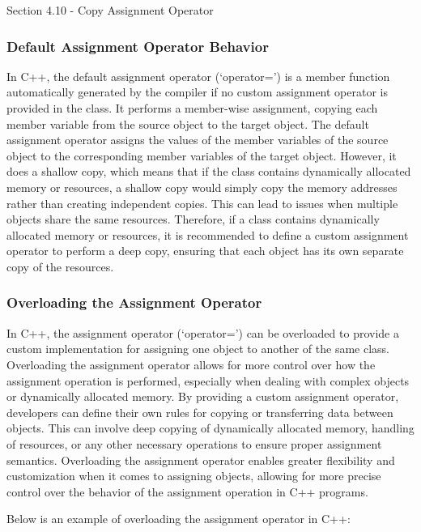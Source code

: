 \begin{notes}{Section 4.10 - Copy Assignment Operator}
    \subsubsection*{Default Assignment Operator Behavior}

    In C++, the default assignment operator (`operator=') is a member function automatically generated by the compiler if no custom assignment operator is provided in the class. It performs a member-wise assignment, copying each member variable from the source object to 
    the target object. The default assignment operator assigns the values of the member variables of the source object to the corresponding member variables of the target object. However, it does a shallow copy, which means that if the class contains dynamically allocated 
    memory or resources, a shallow copy would simply copy the memory addresses rather than creating independent copies. This can lead to issues when multiple objects share the same resources. Therefore, if a class contains dynamically allocated memory or resources, it is 
    recommended to define a custom assignment operator to perform a deep copy, ensuring that each object has its own separate copy of the resources.
    
    \subsubsection*{Overloading the Assignment Operator}
    
    In C++, the assignment operator (`operator=') can be overloaded to provide a custom implementation for assigning one object to another of the same class. Overloading the assignment operator allows for more control over how the assignment operation is performed, 
    especially when dealing with complex objects or dynamically allocated memory. By providing a custom assignment operator, developers can define their own rules for copying or transferring data between objects. This can involve deep copying of dynamically allocated memory, 
    handling of resources, or any other necessary operations to ensure proper assignment semantics. Overloading the assignment operator enables greater flexibility and customization when it comes to assigning objects, allowing for more precise control over the behavior of 
    the assignment operation in C++ programs.
    
    \begin{highlight}
        Below is an example of overloading the assignment operator in C++:
        

\end{highlight}
\end{notes}
